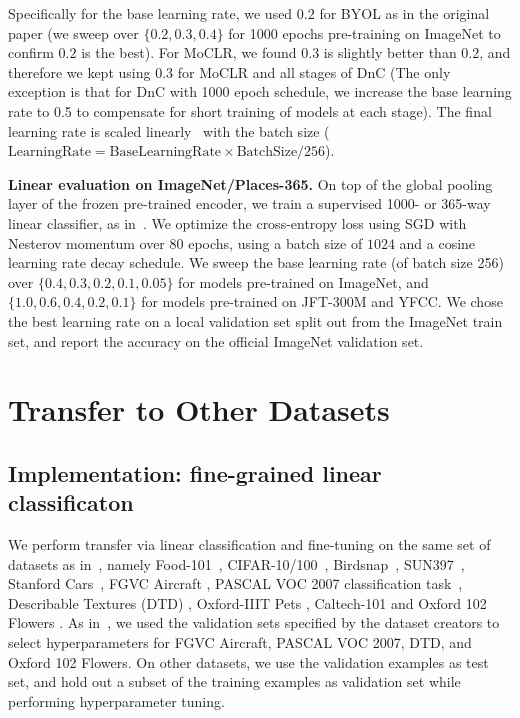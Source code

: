 \documentclass[final]{cvpr}
\newcommand\baseline{MoCLR}
\newcommand\jft{JFT-300M}
\begin{document}
Specifically for the base learning rate, we used $0.2$ for BYOL as in the original paper (we sweep over $\{0.2,0.3,0.4\}$ for 1000 epochs pre-training on ImageNet to confirm $0.2$ is the best). For \baseline{}, we found $0.3$ is slightly better than $0.2$, and therefore we kept using $0.3$ for \baseline{} and all stages of DnC (The only exception is that for DnC with 1000 epoch schedule, we increase the base learning rate to 0.5 to compensate for short training of models at each stage). The final learning rate is scaled linearly~\cite{Goyal2017} with the batch size ($\text{LearningRate} = \text{BaseLearningRate} \times \text{BatchSize} / 256$).

\noindent\textbf{Linear evaluation on ImageNet/Places-365.} On top of the global pooling layer of the frozen pre-trained encoder, we train a supervised 1000- or 365-way linear classifier, as in~\cite{zhang2016colorful,tian2019contrastive,he2020momentum,chen2020simple}. We optimize the cross-entropy loss using SGD with Nesterov momentum over $80$ epochs, using a batch size of $1024$ and a cosine learning rate decay schedule. We sweep the base learning rate (of batch size 256) over $\{0.4, 0.3, 0.2, 0.1, 0.05\}$ for models pre-trained on ImageNet, and $\{1.0, 0.6, 0.4, 0.2, 0.1\}$ for models pre-trained on \jft{} and YFCC. We chose the best learning rate on a local validation set split out from the ImageNet train set, and report the accuracy on the official ImageNet validation set.

\section{Transfer to Other Datasets}\label{sec:more_transfer}

\subsection{Implementation: fine-grained linear classificaton}\label{sec:finegrain_transfer}

We perform transfer via linear classification and fine-tuning on the same set of datasets as in~\cite{chen2020simple,grill2020bootstrap}, namely Food-101~\cite{bossard2014food}, CIFAR-10/100~\cite{krizhevsky2009learning}, Birdsnap~\cite{berg2014birdsnap}, SUN397~\cite{xiao2010sun}, Stanford Cars~\cite{krause2013collecting}, FGVC Aircraft \cite{maji2013fine}, PASCAL VOC 2007 classification task~\cite{everingham2010pascal}, Describable Textures (DTD) \cite{cimpoi2014describing}, Oxford-IIIT Pets \cite{parkhi2012cats}, Caltech-101 \cite{fei2004learning} and Oxford 102 Flowers \cite{nilsback2008automated}. As in~\cite{chen2020simple,grill2020bootstrap}, we used the validation sets specified by the dataset creators to select hyperparameters for FGVC Aircraft, PASCAL VOC
2007, DTD, and Oxford 102 Flowers. On other datasets, we use the validation examples as test set, and hold out a subset of the training examples as validation set while performing hyperparameter tuning.
\end{document}

